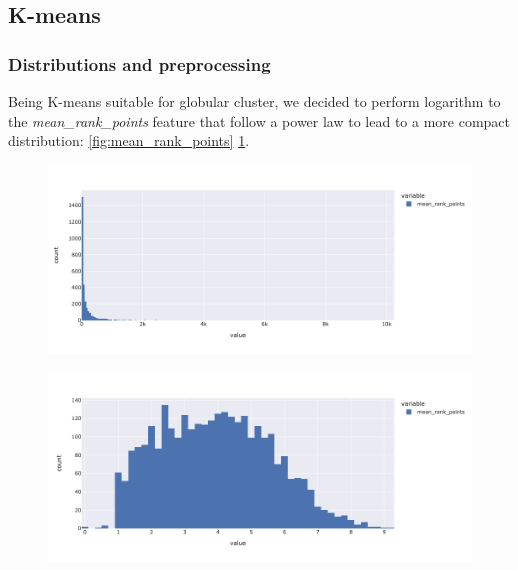 \subsection{K-means}

\subsubsection{Distributions and preprocessing}
Being K-means suitable for globular cluster, we decided to perform logarithm to the \textit{mean\_rank\_points} feature that follow a power law to lead to a more compact distribution:
\ref{fig:mean_rank_points}  \ref{fig:log_mean_rank_points}.

\begin{figure}[h]
\centering
\begin{minipage}{.5\textwidth}
\centering
\includegraphics[width=\textwidth]{plots/kmeans/preprocessing/mean_rank_points}
\label{fig:mean_rank_points}
\end{minipage}%
\begin{minipage}{.5\textwidth}
\centering
\includegraphics[width=\textwidth]{plots/kmeans/preprocessing/log_mean_rank_points.png}
\label{fig:log_mean_rank_points}
\end{minipage}
\end{figure}

